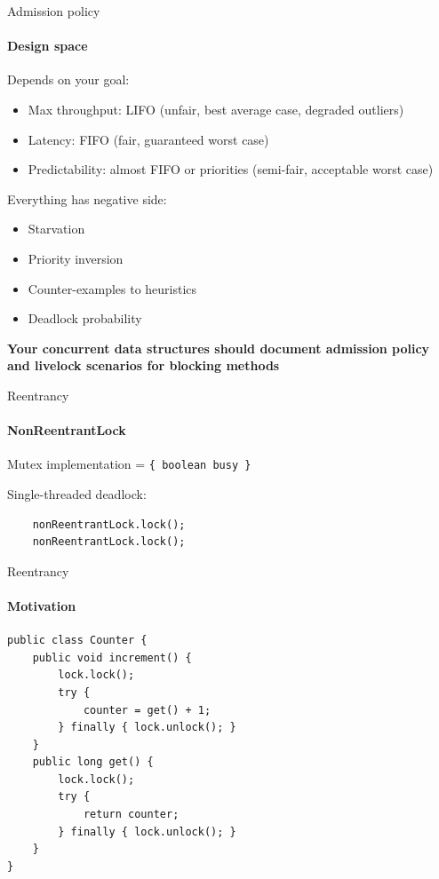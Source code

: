 
\begin{frame}[t,noframenumbering]{Admission policy}
\framesubtitle{Design space}

Depends on your goal:
\begin{itemize}
    \item Max throughput: LIFO (unfair, best average case, degraded outliers)
    \item Latency: FIFO (fair, guaranteed worst case)
    \pause
    \item Predictability: almost FIFO or priorities (semi-fair, acceptable worst case)
\end{itemize}

\pause

Everything has negative side:
\begin{itemize}
    \item Starvation
    \item Priority inversion
    \item Counter-examples to heuristics
    \item Deadlock probability
\end{itemize}

\pause

\textbf{Your concurrent data structures should document admission policy and livelock scenarios for blocking methods}
\end{frame}


\begin{frame}[t, fragile]{Reentrancy}
\framesubtitle{NonReentrantLock}

Mutex implementation = \texttt{\{ boolean busy \}}

\pause

Single-threaded deadlock:
\begin{verbatim}
    nonReentrantLock.lock();
    nonReentrantLock.lock();
\end{verbatim}
\end{frame}


\begin{frame}[fragile]{Reentrancy}
\framesubtitle{Motivation}

\begin{verbatim}
public class Counter {
    public void increment() {
        lock.lock();
        try { 
            counter = get() + 1; 
        } finally { lock.unlock(); }
    }
    public long get() { 
        lock.lock();
        try {  
            return counter; 
        } finally { lock.unlock(); }
    }
}
\end{verbatim}
\end{frame}


